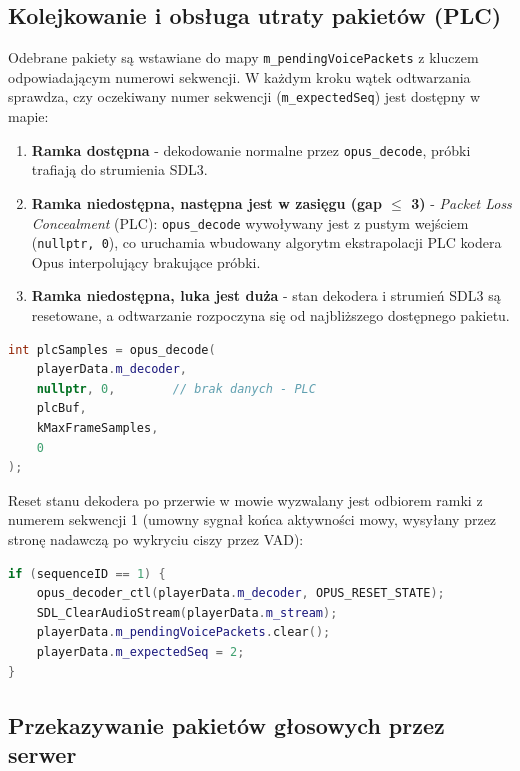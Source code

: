 \subsection*{Kolejkowanie i obsługa utraty pakietów (PLC)}

Odebrane pakiety są wstawiane do mapy \texttt{m\_pendingVoicePackets}
z kluczem odpowiadającym numerowi sekwencji. W każdym kroku wątek
odtwarzania sprawdza, czy oczekiwany numer sekwencji
(\texttt{m\_expectedSeq}) jest dostępny w mapie:

\begin{enumerate}
    \item \textbf{Ramka dostępna} - dekodowanie normalne przez
    \texttt{opus\_decode}, próbki trafiają do strumienia SDL3.
    \item \textbf{Ramka niedostępna, następna jest w zasięgu
    (gap $\leq$ 3)} - \textit{Packet Loss Concealment} (PLC):
    \texttt{opus\_decode} wywoływany jest z pustym wejściem
    (\texttt{nullptr, 0}), co uruchamia wbudowany algorytm
    ekstrapolacji PLC kodera Opus interpolujący brakujące próbki.
    \item \textbf{Ramka niedostępna, luka jest duża} - stan dekodera
    i strumień SDL3 są resetowane, a odtwarzanie rozpoczyna się
    od najbliższego dostępnego pakietu.
\end{enumerate}

\begin{lstlisting}[language=C++, caption={PLC - wywołanie dekodera Opus z pustym wejściem (praca własna)}, label={lst:plc}]
int plcSamples = opus_decode(
    playerData.m_decoder,
    nullptr, 0,        // brak danych - PLC
    plcBuf,
    kMaxFrameSamples,
    0
);
\end{lstlisting}

Reset stanu dekodera po przerwie w mowie wyzwalany jest odbiorem
ramki z numerem sekwencji 1 (umowny sygnał końca aktywności mowy,
wysyłany przez stronę nadawczą po wykryciu ciszy przez VAD):

\begin{lstlisting}[language=C++, caption={Reset dekodera po wykryciu przerwy w mowie (praca własna)}, label={lst:reset}]
if (sequenceID == 1) {
    opus_decoder_ctl(playerData.m_decoder, OPUS_RESET_STATE);
    SDL_ClearAudioStream(playerData.m_stream);
    playerData.m_pendingVoicePackets.clear();
    playerData.m_expectedSeq = 2;
}
\end{lstlisting}

\subsection*{Przekazywanie pakietów głosowych przez serwer}

